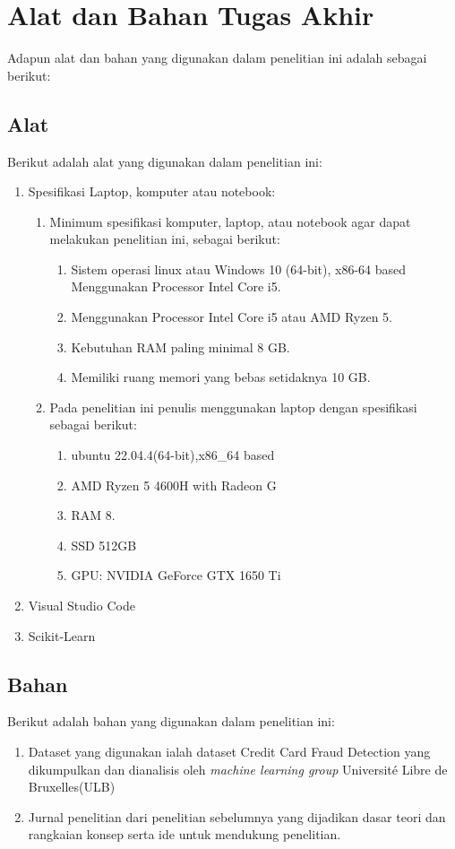 \section{Alat dan Bahan Tugas Akhir}
Adapun alat dan bahan yang digunakan dalam penelitian ini adalah sebagai berikut:
\subsection{Alat}
Berikut adalah alat yang digunakan dalam penelitian ini:
\begin{enumerate}
    \item Spesifikasi Laptop, komputer atau notebook:
    \begin{enumerate}
        \item Minimum spesifikasi komputer, laptop, atau notebook agar dapat melakukan penelitian ini, sebagai berikut:
        \begin{enumerate}
            \item Sistem operasi linux atau  Windows 10 (64-bit), x86-64 based Menggunakan Processor Intel Core i5.
            \item Menggunakan Processor Intel Core i5 atau AMD Ryzen 5.
            \item Kebutuhan RAM paling minimal 8 GB.
            \item Memiliki ruang memori yang bebas setidaknya 10 GB.
        \end{enumerate}
        \item Pada penelitian ini penulis menggunakan laptop dengan spesifikasi sebagai berikut:
        \begin{enumerate}
            \item ubuntu 22.04.4(64-bit),x86\_64 based
            \item AMD Ryzen 5 4600H with Radeon G 
            \item RAM 8.
            \item SSD 512GB
            \item GPU: NVIDIA GeForce GTX 1650 Ti
        \end{enumerate}
    \end{enumerate}
    \item Visual Studio Code
    \item Scikit-Learn
\end{enumerate}
\subsection{Bahan}
Berikut adalah bahan yang digunakan dalam penelitian ini:
\begin{enumerate}
    \item Dataset yang digunakan ialah dataset Credit Card Fraud Detection yang dikumpulkan dan dianalisis oleh \textit{machine learning group} Université Libre de Bruxelles(ULB)
    \item Jurnal penelitian   dari penelitian sebelumnya yang dijadikan dasar teori dan rangkaian konsep serta ide untuk mendukung penelitian.
\end{enumerate}


